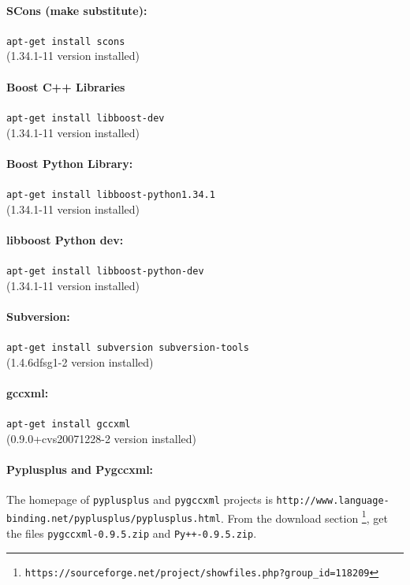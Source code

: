 \documentclass[12pt,a4paper]{article}
\begin{document}
\paragraph{SCons (make substitute):} {\tt apt-get install scons} \\
(1.34.1-11 version installed)


\paragraph{Boost C++ Libraries} {\tt apt-get install libboost-dev} \\
(1.34.1-11 version installed)


\paragraph{Boost Python Library:} {\tt apt-get install libboost-python1.34.1} \\
(1.34.1-11 version installed)


\paragraph{libboost Python dev:} {\tt apt-get install libboost-python-dev} \\
(1.34.1-11 version installed)

\paragraph{Subversion:} {\tt apt-get install subversion subversion-tools} \\
(1.4.6dfsg1-2 version installed)

\paragraph{gccxml:} {\tt apt-get install gccxml} \\
(0.9.0+cvs20071228-2 version installed)

\paragraph{Pyplusplus and Pygccxml: }
The homepage of {\tt pyplusplus} and {\tt pygccxml} projects is 
{\tt http://www.language-binding.net/pyplusplus/pyplusplus.html}. From the
download section \footnote{\tt https://sourceforge.net/project/showfiles.php?group\_id=118209}, 
get the files {\tt pygccxml-0.9.5.zip} and {\tt Py++-0.9.5.zip}.
\end{document}
